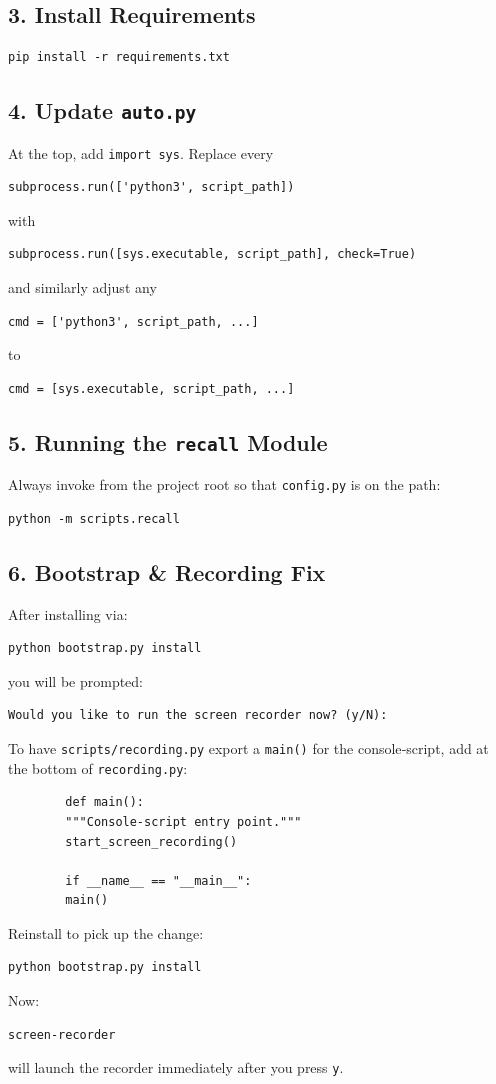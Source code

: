 \documentclass{article}
\begin{document}
	\subsection*{3. Install Requirements}
	
	\begin{lstlisting}[frame=none]
		pip install -r requirements.txt
	\end{lstlisting}
	
	\subsection*{4. Update \texttt{auto.py}}
	
	At the top, add \texttt{import sys}.  
	Replace every
	\begin{lstlisting}[frame=none]
		subprocess.run(['python3', script_path])
	\end{lstlisting}
	with
	\begin{lstlisting}[frame=none]
		subprocess.run([sys.executable, script_path], check=True)
	\end{lstlisting}
	and similarly adjust any
	\begin{lstlisting}[frame=none]
		cmd = ['python3', script_path, ...]
	\end{lstlisting}
	to
	\begin{lstlisting}[frame=none]
		cmd = [sys.executable, script_path, ...]
	\end{lstlisting}
	
	\subsection*{5. Running the \texttt{recall} Module}
	
	Always invoke from the project root so that \texttt{config.py} is on the path:
	\begin{lstlisting}[frame=none]
		python -m scripts.recall
	\end{lstlisting}
	
	\subsection*{6. Bootstrap \& Recording Fix}
	
	After installing via:
	\begin{lstlisting}[frame=none]
		python bootstrap.py install
	\end{lstlisting}
	you will be prompted:
	\begin{lstlisting}[frame=none]
		Would you like to run the screen recorder now? (y/N):
	\end{lstlisting}
	To have \texttt{scripts/recording.py} export a \texttt{main()} for the console‐script, add at the bottom of \texttt{recording.py}:
	\begin{lstlisting}
		def main():
		"""Console-script entry point."""
		start_screen_recording()
		
		if __name__ == "__main__":
		main()
	\end{lstlisting}
	
	Reinstall to pick up the change:
	\begin{lstlisting}[frame=none]
		python bootstrap.py install
	\end{lstlisting}
	
	Now:
	\begin{lstlisting}[frame=none]
		screen-recorder
	\end{lstlisting}
	will launch the recorder immediately after you press \texttt{y}.
	
\end{document}

